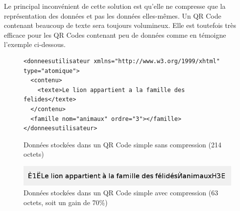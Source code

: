 \par
Le principal inconvénient de cette solution est qu'elle ne compresse que la représentation des données et pas les données elles-mêmes. Un QR Code contenant beaucoup de texte sera toujours volumineux. Elle est toutefois très efficace pour les QR Codes contenant peu de données comme en témoigne l'exemple ci-dessous.

\begin{figure}[!h]
\begin{adjustbox}{minipage=\textwidth,bgcolor={RGB}{240 240 240}}

\lstset{language=XML}

\begin{lstlisting}
<donneesutilisateur xmlns="http://www.w3.org/1999/xhtml" type="atomique">
  <contenu>
    <texte>Le lion appartient a la famille des felides</texte>
  </contenu>
  <famille nom="animaux" ordre="3"></famille>
</donneesutilisateur>

\end{lstlisting}

\end{adjustbox}
\caption{Données stockées dans un QR Code simple sans compression (214 octets)}

\end{figure}\textbf{}


\begin{figure}[!h]
	\centering
   \includegraphics[scale=0.6]{img/compression.png}
   \caption{Données stockées dans un QR Code simple avec compression (63 octets, soit un gain de 70\%)}
\end{figure}